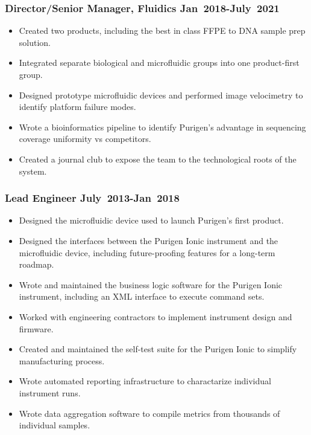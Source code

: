 \documentclass{res}
\begin{document}
\begin{resume}
    \subsubsection{Director/Senior Manager, Fluidics \> Jan~2018-July~2021}
       \begin{itemize}
        \item Created two products, including the best in class FFPE to DNA sample prep solution.
        \item Integrated separate biological and microfluidic groups into one product-first group.
        \item Designed prototype microfluidic devices and performed image velocimetry to identify platform failure modes.
        \item Wrote a bioinformatics pipeline to identify Purigen's advantage in sequencing coverage uniformity vs competitors.
        \item Created a journal club to expose the team to the technological roots of the system.
       \end{itemize}

    \subsubsection{Lead Engineer \> July~2013-Jan~2018}
      \begin{itemize}
        \item Designed the microfluidic device used to launch Purigen's first product.
        \item Designed the interfaces between the Purigen Ionic instrument and the microfluidic device, including future-proofing features for a long-term roadmap.
        \item Wrote and maintained the business logic software for the Purigen Ionic instrument, including an XML interface to execute command sets.
        \item Worked with engineering contractors to implement instrument design and firmware.
        \item Created and maintained the self-test suite for the Purigen Ionic to simplify manufacturing process.
        \item Wrote automated reporting infrastructure to charactarize individual instrument runs.
        \item Wrote data aggregation software to compile metrics from thousands of individual samples.
      \end{itemize}


\end{resume}
\end{document}
